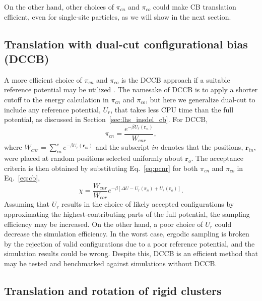 \documentclass[
  9pt,
  bestpractices,
  pubversion,
]{livecoms}
\begin{document}
On the other hand, other choices of $\pi_{cn}$ and $\pi_{co}$ could make CB translation efficient, even for single-site particles, as we will show in the next section.

\subsection{\label{sec:lhs_disp_dccb}Translation with dual-cut configurational bias (DCCB)}

A more efficient choice of $\pi_{cn}$ and $\pi_{co}$ is the DCCB approach if a suitable reference potential may be utilized \cite{vlugt_improving_1998}.
The namesake of DCCB is to apply a shorter cutoff to the energy calculation in $\pi_{cn}$ and $\pi_{co}$, but here we generalize dual-cut to include any reference potential, $U_r$, that takes less CPU time than the full potential, as discussed in Section~\ref{sec:lhs_insdel_cb}.
For DCCB,
\begin{equation}
\pi_{cn}=\frac{e^{-\beta U_r(\mathbf{r}_n)}}{W_{cnr}},
\label{eq:pcnr}
\end{equation}
where $W_{cnr}=\sum_{in}^c e^{-\beta U_r(\mathbf{r}_{in})}$ and the subscript $in$ denotes that the positions, $\mathbf{r}_{in}$, were placed at random positions selected uniformly about $\mathbf{r}_o$.
The acceptance criteria is then obtained by substituting Eq.~\ref{eq:pcnr} for both $\pi_{cn}$ and $\pi_{co}$ in Eq.~\ref{eq:cb},
\begin{equation}
\chi = \frac{W_{cnr}}{W_{cor}}e^{-\beta [\Delta U - U_r(\mathbf{r}_n) + U_r(\mathbf{r}_o)]}.
\end{equation}
Assuming that $U_r$ results in the choice of likely accepted configurations by approximating the highest-contributing parts of the full potential, the sampling efficiency may be increased.
On the other hand, a poor choice of $U_r$ could decrease the simulation efficiency.
In the worst case, ergodic sampling is broken by the rejection of valid configurations due to a poor reference potential, and the simulation results could be wrong.
Despite this, DCCB is an efficient method that may be tested and benchmarked against simulations without DCCB.

\subsection{\label{sec:lhs_cluster}Translation and rotation of rigid clusters}
\end{document}
